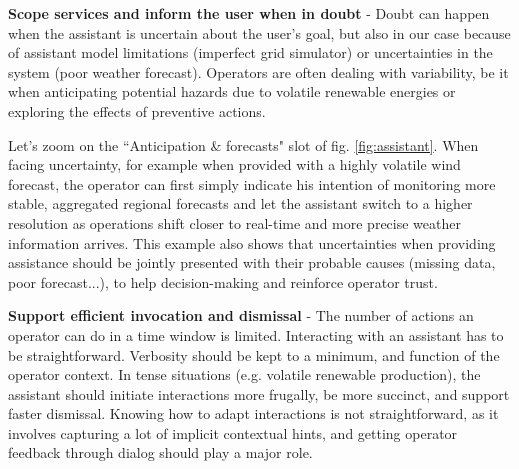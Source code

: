 \documentclass{IOS-Book-Article}
\begin{document}

\textbf{Scope services and inform the user when in doubt} - 
Doubt can happen when the assistant is uncertain about the user's goal, but also in our case because of assistant model limitations (imperfect grid simulator) or uncertainties in the system (poor weather forecast). Operators are often dealing with variability, be it when anticipating potential hazards due to volatile renewable energies or exploring the effects of preventive actions. 

Let's zoom on the ``Anticipation \& forecasts" slot of fig. \ref{fig:assistant}. When facing uncertainty, for example  when provided with a highly volatile wind forecast, the operator can first simply indicate his intention of monitoring more stable, aggregated regional forecasts and let the assistant switch to a higher resolution as operations shift closer to real-time and more precise weather information arrives. This example also shows that uncertainties when providing assistance should be jointly presented with their probable causes (missing data, poor forecast...), to help decision-making and reinforce operator trust. 







\textbf{Support efficient invocation and dismissal} - The number of actions an operator can do in a time window is limited. Interacting with an assistant has to be straightforward. Verbosity should be kept to a minimum, and function of the operator context. In tense situations (e.g.  volatile renewable production), the assistant should initiate interactions more frugally, be more succinct, and support faster dismissal. Knowing how to adapt interactions is not straightforward, as it involves capturing a lot of implicit contextual hints, and getting operator feedback through dialog should play a major role.
\end{document}
